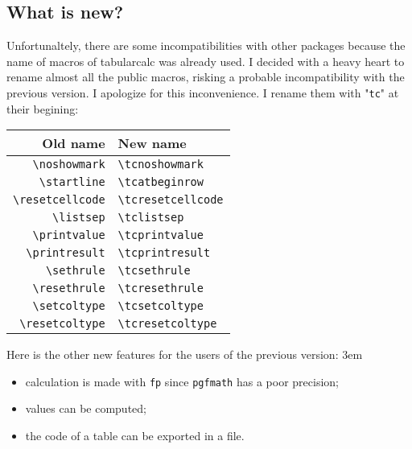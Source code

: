 \documentclass[a4paper,10pt]{article}
\newcommand\tbcalc{\textsf{tabularcalc}\xspace}
\begin{document}
\subsection{What is new?}
Unfortunaltely, there are some incompatibilities with other packages because the name of macros of \tbcalc was already used. I decided with a heavy heart to rename almost all the public macros, risking a probable incompatibility with the previous version. I apologize for this inconvenience. I rename them with "\verb=tc=" at their begining:
\begin{center}
	\begin{tabular}{rl}
		Old name&New name\\\hline
		\verb=\noshowmark=&\verb=\tcnoshowmark= \\
		\verb=\startline=&\verb=\tcatbeginrow=\\
		\verb=\resetcellcode=&\verb=\tcresetcellcode=\\
		\verb=\listsep=&\verb=\tclistsep=\\
		\verb=\printvalue=&\verb=\tcprintvalue=\\
		\verb=\printresult=&\verb=\tcprintresult=\\
		\verb=\sethrule=&\verb=\tcsethrule=\\
		\verb=\resethrule=&\verb=\tcresethrule=\\
		\verb=\setcoltype=&\verb=\tcsetcoltype=\\
		\verb=\resetcoltype=&\verb=\tcresetcoltype=
	\end{tabular}
\end{center}

Here is the other new features for the users of the previous version:
\parindent3em
\begin{itemize}
	\item calculation is made with \verb=fp= since \verb=pgfmath= has a poor precision;
	\item values can be computed;
	\item the code of a table can be exported in a file.
\end{itemize}\parindent0pt
\end{document}
